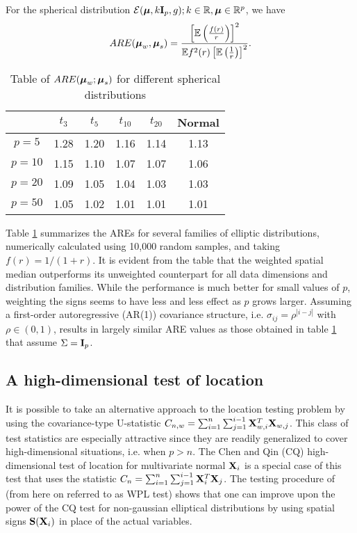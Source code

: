 \begin{Corollary}
For the spherical distribution $\mathcal{E}({\boldsymbol{\mu}}, k {\mathbf{I}}_p, g); k \in \mathbb R, {\boldsymbol{\mu}} \in \mathbb R^p$, we have
%
$$
ARE( {\boldsymbol{\mu}}_w, {\boldsymbol{\mu}}_s) = \frac{ \left[ {\mathbb{E}} \left( \frac{f(r)}{r} \right) \right]^2}{{\mathbb{E}} f^2(r) \left[ {\mathbb{E}} \left( \frac{1}{r} \right) \right]^2 }.
$$
\end{Corollary}
%
\begin{table}[t]
\centering
\begin{footnotesize}
\begin{tabular}{c|ccccc}
    \hline
    & $t_3$   & $t_5$   & $t_{10}$  & $t_{20}$  & Normal \\ \hline
    $p=5$    & 1.28 & 1.20 & 1.16 & 1.14 & 1.13   \\
    $p=10$   & 1.15 & 1.10 & 1.07 & 1.07 & 1.06   \\
    $p=20$   & 1.09 & 1.05 & 1.04 & 1.03 & 1.03   \\
    $p=50$   & 1.05 & 1.02 & 1.01 & 1.01 & 1.01   \\ \hline
\end{tabular}
\end{footnotesize}
\caption{Table of $ARE({\boldsymbol{\mu}}_w; {\boldsymbol{\mu}}_s)$ for different spherical distributions}
\label{table:AREtablewsm}
\end{table}
%
Table \ref{table:AREtablewsm} summarizes the AREs for several families of elliptic distributions, numerically calculated using 10,000 random samples, and taking $f(r) = 1/(1+r)$. It is evident from the table that the weighted spatial median outperforms its unweighted counterpart for all data dimensions and distribution families. While the performance is much better for small values of $p$, weighting the signs seems to have less and less effect as $p$ grows larger. Assuming a first-order autoregressive (AR(1)) covariance structure, i.e. $\sigma_{ij} = \rho^{|i-j|}$ with $ \rho \in (0,1)$, results in largely similar ARE values as those obtained in table \ref{table:AREtablewsm} that assume $\Sigma = {\mathbf{I}}_p$.

\subsection{A high-dimensional test of location}

It is possible to take an alternative approach to the location testing problem by using the covariance-type U-statistic $C_{n,w} = \sum_{i=1}^n \sum_{j=1}^{i-1} {\mathbf{X}}_{w,i}^T {\mathbf{X}}_{w,j}$. This class of test statistics are especially attractive since they are readily generalized to cover high-dimensional situations, i.e. when $p > n$. The Chen and Qin (CQ) high-dimensional test of location for multivariate normal ${\mathbf{X}}_i$ \citep{ChenQin10} is a special case of this test that uses the statistic $C_n = \sum_{i=1}^n \sum_{j=1}^{i-1} {\mathbf{X}}_i^T {\mathbf{X}}_j$. The testing procedure of \cite{WangPengLi15} (from here on referred to as WPL test) shows that one can improve upon the power of the CQ test for non-gaussian elliptical distributions by using spatial signs ${\mathbf{S}}({\mathbf{X}}_i)$ in place of the actual variables.

